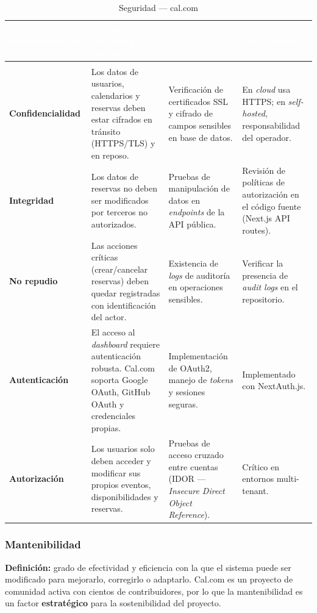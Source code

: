 \documentclass[12pt, a4paper]{article}
\newcommand{\rowpair}{\rowcolor{grisMedio}}
\newcommand{\rowimpar}{\rowcolor{grisClaro}}
\begin{document}
\begin{longtable}{>{\bfseries}p{3cm} p{4.5cm} p{4cm} p{3.5cm}}
\caption{Seguridad — cal.com} \label{tab:seguridad} \\
\rowcolor{azulClaro}
\textcolor{white}{\textbf{Subcaracterística}} &
\textcolor{white}{\textbf{Descripción aplicada a cal.com}} &
\textcolor{white}{\textbf{Criterio de evaluación}} &
\textcolor{white}{\textbf{Observaciones}} \\
\endfirsthead
\multicolumn{4}{c}{\tablename\ \thetable{} -- continuación} \\
\endhead
\rowpair
Confidencialidad &
Los datos de usuarios, calendarios y reservas deben estar cifrados en tránsito
(HTTPS/TLS) y en reposo. &
Verificación de certificados SSL y cifrado de campos sensibles en base de datos. &
En \textit{cloud} usa HTTPS; en \textit{self-hosted}, responsabilidad del operador. \\
\rowimpar
Integridad &
Los datos de reservas no deben ser modificados por terceros no autorizados. &
Pruebas de manipulación de datos en \textit{endpoints} de la API pública. &
Revisión de políticas de autorización en el código fuente (Next.js API routes). \\
\rowpair
No repudio &
Las acciones críticas (crear/cancelar reservas) deben quedar registradas con
identificación del actor. &
Existencia de \textit{logs} de auditoría en operaciones sensibles. &
Verificar la presencia de \textit{audit logs} en el repositorio. \\
\rowimpar
Autenticación &
El acceso al \textit{dashboard} requiere autenticación robusta. Cal.com soporta Google
OAuth, GitHub OAuth y credenciales propias. &
Implementación de OAuth2, manejo de \textit{tokens} y sesiones seguras. &
Implementado con NextAuth.js. \\
\rowpair
Autorización &
Los usuarios solo deben acceder y modificar sus propios eventos, disponibilidades y
reservas. &
Pruebas de acceso cruzado entre cuentas (IDOR — \textit{Insecure Direct Object
Reference}). &
Crítico en entornos multi-tenant. \\
\end{longtable}

\subsubsection{Mantenibilidad}

\textbf{Definición:} grado de efectividad y eficiencia con la que el sistema puede ser
modificado para mejorarlo, corregirlo o adaptarlo. Cal.com es un proyecto de comunidad
activa con cientos de contribuidores, por lo que la mantenibilidad es un factor
\textbf{estratégico} para la sostenibilidad del proyecto.
\end{document}
